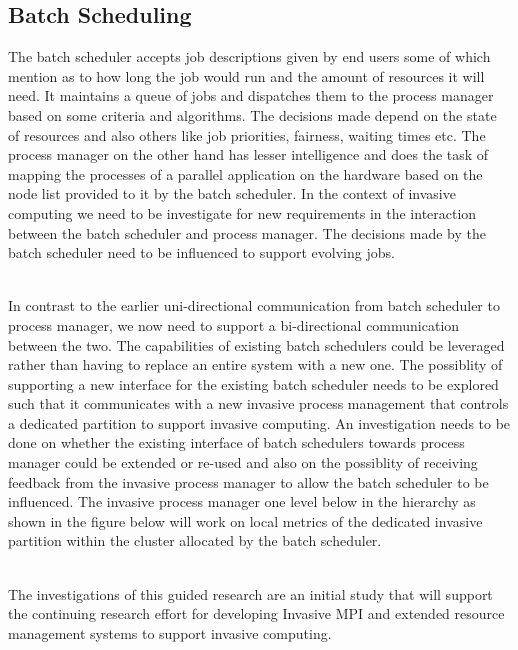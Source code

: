 \documentclass[a4paper, 12pt]{article}
\begin{document}
\subsection{Batch Scheduling}
The batch scheduler accepts job descriptions given by end users some of which mention as to how long the job would run and the amount of resources it will need. It maintains a queue of jobs and dispatches them to the process manager based on some criteria and algorithms. The decisions made depend on the state of resources and also others like job priorities, fairness, waiting times etc. The process manager on the other hand has lesser intelligence and does the task of mapping the processes of a parallel application on the hardware based on the node list provided to it by the batch scheduler. In the context of invasive computing we need to be investigate for new requirements in the interaction between the batch scheduler and process manager. The decisions made by the batch scheduler need to be influenced to support evolving jobs.\par
\noindent
\\In contrast to the earlier uni-directional communication from batch scheduler to process manager, we now need to support a bi-directional communication between the two. The capabilities of existing batch schedulers could be leveraged rather than having to replace an entire system with a new one. The possiblity of supporting a new interface for the existing batch scheduler needs to be explored such that it communicates with a new invasive process management that controls a dedicated partition to support invasive computing. An investigation needs to be done on whether the existing interface of batch schedulers towards process manager could be extended or re-used and also on the possiblity of receiving feedback from the invasive process manager to allow the batch scheduler to be influenced. The invasive process manager one level below in the hierarchy as shown in the figure below will work on local metrics of the dedicated invasive partition within the cluster allocated by the batch scheduler.\par
\noindent
\\The investigations of this guided research are an initial study that will support the continuing research effort for developing Invasive MPI and extended resource management systems to support invasive computing.

\newpage
\end{document}
